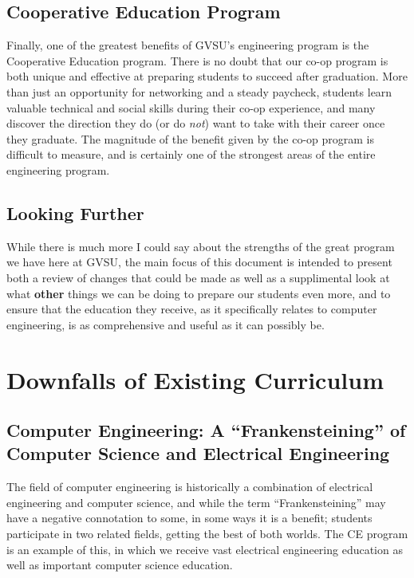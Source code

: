 \documentclass[12pt]{article}
\numberwithin{figure}{section}
\numberwithin{equation}{section}
\begin{document}
{\subsection{Cooperative Education Program}\label{cooperative-education-program}
Finally, one of the greatest benefits of GVSU's engineering program is
the Cooperative Education program. There is no doubt that our co-op
program is both unique and effective at preparing students to succeed
after graduation. More than just an opportunity for networking and a
steady paycheck, students learn valuable technical and social skills
during their co-op experience, and many discover the direction they do
(or do \emph{not}) want to take with their career once they graduate.
The magnitude of the benefit given by the co-op program is difficult to
measure, and is certainly one of the strongest areas of the entire
engineering program.

\subsection{Looking Further}\label{looking-further}
While there is much more I could say about the strengths of the great
program we have here at GVSU, the main focus of this document is
intended to present both a review of changes that could be made as well
as a supplimental look at what \textbf{other} things we can be doing to
prepare our students even more, and to ensure that the education they
receive, as it specifically relates to computer engineering, is as
comprehensive and useful as it can possibly be.

\newpage
\section{Downfalls of Existing Curriculum}\label{downfalls}

\subsection{Computer Engineering: A ``Frankensteining'' of Computer Science and Electrical Engineering}\label{frankenstein}
The field of computer engineering is historically a combination of
electrical engineering and computer science, and while the term
``Frankensteining'' may have a negative connotation to some, in some
ways it is a benefit; students participate in two related fields,
getting the best of both worlds. The CE program is an example of this,
in which we receive vast electrical engineering education as well as
important computer science education.

}
\end{document}

